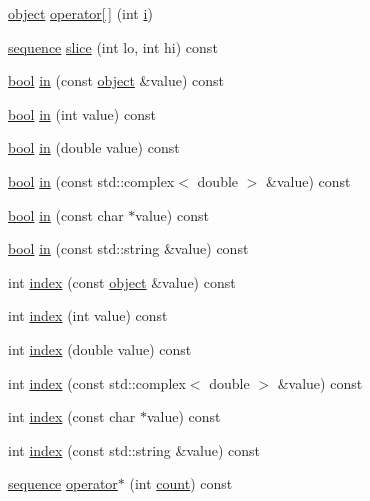 \begin{DoxyCompactItemize}
\item 
\hyperlink{classpy_1_1object}{object} \hyperlink{classpy_1_1sequence_ac14cc28e90beb39eb1e8891c0aebfcdd}{operator\mbox{[}$\,$\mbox{]}} (int \hyperlink{indexexpr_8h_aabd77643995707c185e95c8cb2782c81}{i})
\item 
\hyperlink{classpy_1_1sequence}{sequence} \hyperlink{classpy_1_1sequence_a23c8f75fd20de310deff1b7a7465cccc}{slice} (int lo, int hi) const 
\item 
\hyperlink{compiler_8h_abb452686968e48b67397da5f97445f5b}{bool} \hyperlink{classpy_1_1sequence_ad36804ff76c63f6195ba376123ada024}{in} (const \hyperlink{classpy_1_1object}{object} \&value) const 
\item 
\hyperlink{compiler_8h_abb452686968e48b67397da5f97445f5b}{bool} \hyperlink{classpy_1_1sequence_adc05421113e0c8ecefeabd84b74765cd}{in} (int value) const 
\item 
\hyperlink{compiler_8h_abb452686968e48b67397da5f97445f5b}{bool} \hyperlink{classpy_1_1sequence_a724a410bd4dc03d0c20c6d39811dfd15}{in} (double value) const 
\item 
\hyperlink{compiler_8h_abb452686968e48b67397da5f97445f5b}{bool} \hyperlink{classpy_1_1sequence_a95221faf1f3f062cc0728695e52e1042}{in} (const std\+::complex$<$ double $>$ \&value) const 
\item 
\hyperlink{compiler_8h_abb452686968e48b67397da5f97445f5b}{bool} \hyperlink{classpy_1_1sequence_a82ee53578e54e88ad1ec5f72cdae849a}{in} (const char $\ast$value) const 
\item 
\hyperlink{compiler_8h_abb452686968e48b67397da5f97445f5b}{bool} \hyperlink{classpy_1_1sequence_a3aaeb368a6c2ca042b8a41d960cd49bc}{in} (const std\+::string \&value) const 
\item 
int \hyperlink{classpy_1_1sequence_a41abeb703789e021db1dc1ab8dcbf4fb}{index} (const \hyperlink{classpy_1_1object}{object} \&value) const 
\item 
int \hyperlink{classpy_1_1sequence_afb0d9caae5177d937484f6bd43f9dbb0}{index} (int value) const 
\item 
int \hyperlink{classpy_1_1sequence_a256624378357b93a01c202c7114201c8}{index} (double value) const 
\item 
int \hyperlink{classpy_1_1sequence_ae7c2431ae61aac1454b3cddea16674fa}{index} (const std\+::complex$<$ double $>$ \&value) const 
\item 
int \hyperlink{classpy_1_1sequence_ae01ae3b01d0b86954a686c0b44c994d5}{index} (const char $\ast$value) const 
\item 
int \hyperlink{classpy_1_1sequence_a73b4c5a37bab28e14993854857e2c553}{index} (const std\+::string \&value) const 
\item 
\hyperlink{classpy_1_1sequence}{sequence} \hyperlink{classpy_1_1sequence_ad9d9fb58a6751e77c7b94fd16bbb82dc}{operator$\ast$} (int \hyperlink{classpy_1_1sequence_a4bf58c29f02b2ea72f820ca296eae790}{count}) const 
\end{DoxyCompactItemize}
